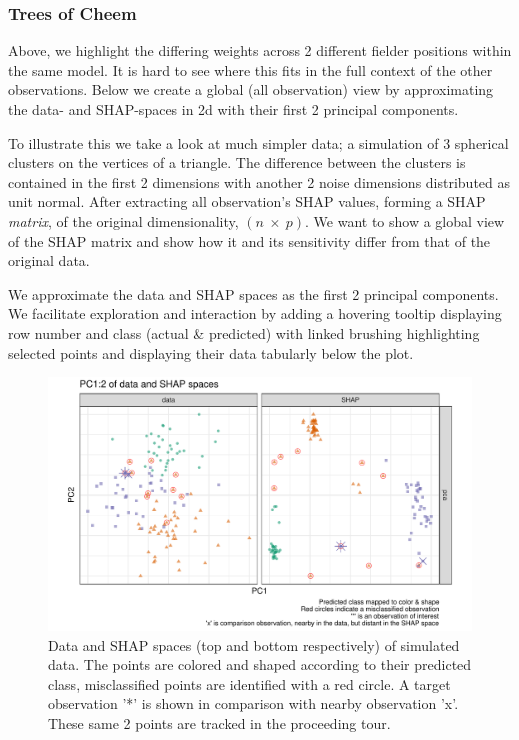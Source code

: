\documentclass[
  11,
]{article}
\begin{document}
\hypertarget{trees-of-cheem}{%
\subsubsection{Trees of Cheem}\label{trees-of-cheem}}

Above, we highlight the differing weights across 2 different fielder positions within the same model. It is hard to see where this fits in the full context of the other observations. Below we create a global (all observation) view by approximating the data- and SHAP-spaces in 2d with their first 2 principal components.

To illustrate this we take a look at much simpler data; a simulation of 3 spherical clusters on the vertices of a triangle. The difference between the clusters is contained in the first 2 dimensions with another 2 noise dimensions distributed as unit normal. After extracting all observation's SHAP values, forming a SHAP \emph{matrix}, of the original dimensionality, \((n~\times~p)\). We want to show a global view of the SHAP matrix and show how it and its sensitivity differ from that of the original data.

We approximate the data and SHAP spaces as the first 2 principal components. We facilitate exploration and interaction by adding a hovering tooltip displaying row number and class (actual \& predicted) with linked brushing highlighting selected points and displaying their data tabularly below the plot.

\begin{figure}

{\centering \includegraphics[width=1\linewidth]{figures/cheem_pca} 

}

\caption{Data and SHAP spaces (top and bottom respectively) of simulated data. The points are colored and shaped according to their predicted class, misclassified points are identified with a red circle. A target observation '*' is shown in comparison with nearby observation 'x'. These same 2 points are tracked in the proceeding tour.}\label{fig:cheemPca}
\end{figure}
\end{document}
